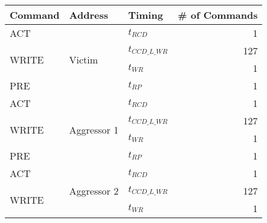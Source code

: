 \begin{table}[!ht]
  \centering
  \scriptsize
  \caption{}
  \begin{adjustbox}{width=0.7\linewidth}
  \begin{tabular}{|l||l|l|r|}
  \hline
  \textbf{Command}                & \textbf{Address}                      & \textbf{Timing}      & \textbf{\# of Commands}                 \\ \hline\hline
  ACT                    & \multirow{4}{*}{Victim}      & $t_{RCD}$        & 1                              \\ \cline{1-1} \cline{3-4} 
  \multirow{2}{*}{WRITE} &                              & $t_{CCD\_L\_WR}$ & 127                            \\ \cline{3-4} 
                         &                              & $t_{WR}$         & 1                              \\ \cline{1-1} \cline{3-4} 
  PRE                    &                              & $t_{RP}$         & 1                              \\ \hline
  ACT                    & \multirow{4}{*}{Aggressor 1} & $t_{RCD}$        & 1                              \\ \cline{1-1} \cline{3-4} 
  \multirow{2}{*}{WRITE} &                              & $t_{CCD\_L\_WR}$ & 127                            \\ \cline{3-4} 
                         &                              & $t_{WR}$         & 1                              \\ \cline{1-1} \cline{3-4} 
  PRE                    &                              & $t_{RP}$         & 1                              \\ \hline
  ACT                    & \multirow{4}{*}{Aggressor 2} & $t_{RCD}$        & 1                              \\ \cline{1-1} \cline{3-4} 
  \multirow{2}{*}{WRITE} &                              & $t_{CCD\_L\_WR}$ & 127                            \\ \cline{3-4} 
                         &                              & $t_{WR}$         & 1                              \\ \cline{1-1} \cline{3-4} 

\end{tabular}
\end{adjustbox}
\end{table}
